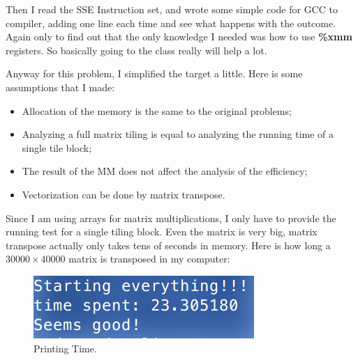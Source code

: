\documentclass[11pt]{article}
\begin{document}
Then I read the SSE Instruction set, and wrote some simple code for GCC to compiler, adding one line each time and see what happens with the outcome. 
Again only to find out that the only knowledge I needed was how to use \textbf{\%xmm} registers. So basically going to the class really will help a lot. 

Anyway for this problem, I simplified the target a little. Here is some assumptions that I made:
\begin{itemize}
\item Allocation of the memory is the same to the original problems;
\item Analyzing a full matrix tiling is equal to analyzing the running time of a single tile block;
\item The result of the MM does not affect the analysis of the efficiency;
\item Vectorization can be done by matrix transpose.
\end{itemize}

Since I am using arrays for matrix multiplications, I only have to provide the running test for a single tiling block. Even the matrix is very big, 
matrix transpose actually only takes tens of seconds in memory. Here is how long  a \(30000\times 40000\) matrix is transposed in my computer:
\begin{figure}[htb]
\centering
\includegraphics[width=.9\linewidth]{./transpose.png}
\caption{\label{fig:orgparagraph3}
Printing Time.}
\end{figure}
\end{document}
